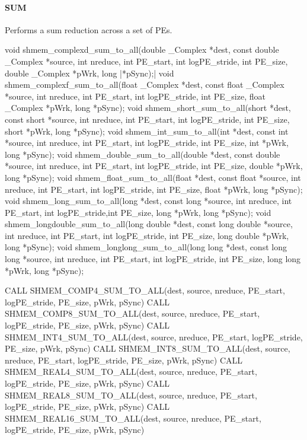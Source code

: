\begin{apidefinition}
\paragraph{SUM}
Performs a sum reduction across a set of \acp{PE}.\newline
\begin{Csynopsis}
void shmem_complexd_sum_to_all(double _Complex *dest, const double _Complex *source, int nreduce, int PE_start, int logPE_stride, int PE_size, double _Complex *pWrk, long |\mbox{*pSync);}|
void shmem_complexf_sum_to_all(float _Complex *dest, const float _Complex *source, int nreduce, int PE_start, int logPE_stride, int PE_size, float _Complex *pWrk, long *pSync);
void shmem_short_sum_to_all(short *dest, const short *source, int nreduce, int PE_start, int logPE_stride, int PE_size, short *pWrk, long *pSync);
void shmem_int_sum_to_all(int *dest, const int *source, int nreduce, int PE_start, int logPE_stride, int PE_size, int *pWrk, long *pSync);
void shmem_double_sum_to_all(double *dest, const double *source, int nreduce, int PE_start, int logPE_stride, int PE_size, double *pWrk, long *pSync);
void shmem_float_sum_to_all(float *dest, const float *source, int nreduce, int PE_start, int logPE_stride, int PE_size, float *pWrk, long *pSync);
void shmem_long_sum_to_all(long *dest, const long *source, int nreduce, int PE_start, int logPE_stride,int PE_size, long *pWrk, long *pSync);
void shmem_longdouble_sum_to_all(long double *dest, const long double *source, int nreduce, int PE_start, int logPE_stride, int PE_size, long double *pWrk, long *pSync);
void shmem_longlong_sum_to_all(long long *dest, const long long *source, int nreduce, int PE_start, int logPE_stride, int PE_size, long long *pWrk, long *pSync);
\end{Csynopsis}

\begin{Fsynopsis}
CALL SHMEM_COMP4_SUM_TO_ALL(dest, source, nreduce, PE_start, logPE_stride, PE_size, pWrk, pSync)
CALL SHMEM_COMP8_SUM_TO_ALL(dest, source, nreduce, PE_start, logPE_stride, PE_size, pWrk, pSync)
CALL SHMEM_INT4_SUM_TO_ALL(dest, source, nreduce, PE_start, logPE_stride, PE_size, pWrk, pSync)
CALL SHMEM_INT8_SUM_TO_ALL(dest, source, nreduce, PE_start, logPE_stride, PE_size, pWrk, pSync)
CALL SHMEM_REAL4_SUM_TO_ALL(dest, source, nreduce, PE_start, logPE_stride, PE_size, pWrk, pSync)
CALL SHMEM_REAL8_SUM_TO_ALL(dest, source, nreduce, PE_start, logPE_stride, PE_size, pWrk, pSync)
CALL SHMEM_REAL16_SUM_TO_ALL(dest, source, nreduce, PE_start, logPE_stride, PE_size, pWrk, pSync)
\end{Fsynopsis}


\end{apidefinition}
